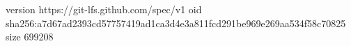 version https://git-lfs.github.com/spec/v1
oid sha256:a7d67ad2393cd57757419ad1ca3d4e3a811fcd291be969e269aa534f58c70825
size 699208
